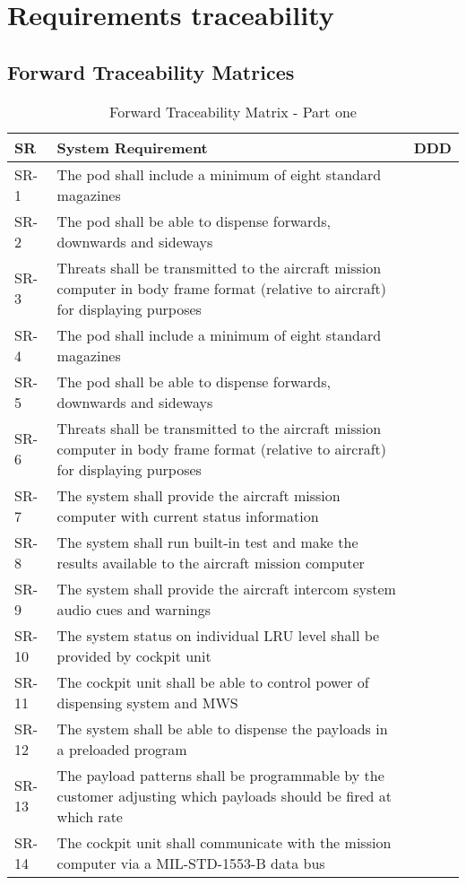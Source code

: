 \documentclass[Main]{subfiles}
\begin{document}
\chapter{Requirements traceability}


\section{Forward Traceability Matrices}

\begin{table}[htbp]
	\centering
	\begin{longtable}{p{} p{} p{}} \hline
	SR & System Requirement & DDD \\\hline
	SR-1 & The pod shall include a minimum of eight standard magazines &  \\
	SR-2 & The pod shall be able to dispense forwards, downwards and sideways & \\
	SR-3 & Threats shall be transmitted to the aircraft mission computer in body frame format (relative to aircraft) for displaying purposes &  \\
	SR-4 & The pod shall include a minimum of eight standard magazines &  \\
	SR-5 & The pod shall be able to dispense forwards, downwards and sideways & \\
	SR-6 & Threats shall be transmitted to the aircraft mission computer in body frame format
	(relative to aircraft) for displaying purposes &  \\
	SR-7 & The system shall provide the aircraft mission computer with current status information &  \\
	SR-8 &  The system shall run built-in test and make the results available to the aircraft mission
	computer &  \\
	SR-9 & The system shall provide the aircraft intercom system audio cues and warnings &  \\
	SR-10 &  The system status on individual LRU level shall be provided by cockpit unit &  \\
	SR-11 & The cockpit unit shall be able to control power of dispensing system and MWS &  \\
	SR-12 & The system shall be able to dispense the payloads in a preloaded program &  \\
	SR-13 & The payload patterns shall be programmable by the customer adjusting which payloads
	should be fired at which rate &  \\
	SR-14 & The cockpit unit shall communicate with the mission computer via a MIL-STD-1553-B
	data bus &  \\\hline
	\end{longtable}
\caption{Forward Traceability Matrix - Part one}
\label{Tab:ForwardPartOne}
\end{table}
\end{document}
